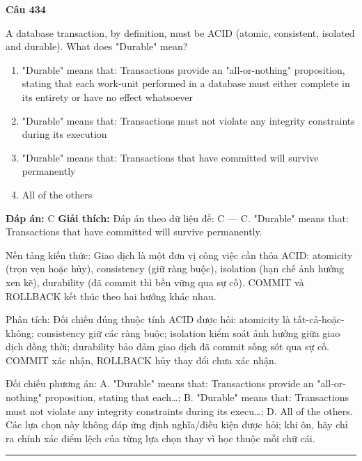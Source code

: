\documentclass[11pt,a4paper]{article}
\newenvironment{question}[1]{%
  \par\vspace{1em}\noindent\textbf{\large Câu #1}\par\vspace{0.4em}
}{%
  \par\vspace{1em}\hrule\vspace{0.6em}
}
\newenvironment{choices}{%
  \begin{enumerate}[label=\textbf{\Alph*.},leftmargin=2.2em,itemsep=2pt,topsep=3pt]
}{%
  \end{enumerate}
}
\newcommand{\choice}{\item}
\begin{document}
\begin{question}{434}
A database transaction, by definition, must be ACID (atomic, consistent, isolated and durable). What does "Durable" mean?
\begin{choices}
\choice "Durable" means that: Transactions provide an "all-or-nothing" proposition, stating that each work-unit performed in a database must either complete in its entirety or have no effect whatsoever
\choice "Durable" means that: Transactions must not violate any integrity constraints during its execution
\choice "Durable" means that: Transactions that have committed will survive permanently
\choice All of the others
\end{choices}
\textbf{Đáp án:} C
\textbf{Giải thích:} Đáp án theo dữ liệu đề: C — C. "Durable" means that: Transactions that have committed will survive permanently.

Nền tảng kiến thức: Giao dịch là một đơn vị công việc cần thỏa ACID: atomicity (trọn vẹn hoặc hủy), consistency (giữ ràng buộc), isolation (hạn chế ảnh hưởng xen kẽ), durability (đã commit thì bền vững qua sự cố). COMMIT và ROLLBACK kết thúc theo hai hướng khác nhau.

Phân tích: Đối chiếu đúng thuộc tính ACID được hỏi: atomicity là tất-cả-hoặc-không; consistency giữ các ràng buộc; isolation kiểm soát ảnh hưởng giữa giao dịch đồng thời; durability bảo đảm giao dịch đã commit sống sót qua sự cố. COMMIT xác nhận, ROLLBACK hủy thay đổi chưa xác nhận.

Đối chiếu phương án: A. "Durable" means that: Transactions provide an "all-or-nothing" proposition, stating that each…; B. "Durable" means that: Transactions must not violate any integrity constraints during its execu…; D. All of the others. Các lựa chọn này không đáp ứng định nghĩa/điều kiện được hỏi; khi ôn, hãy chỉ ra chính xác điểm lệch của từng lựa chọn thay vì học thuộc mỗi chữ cái.
\end{question}
\end{document}
